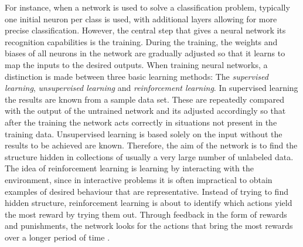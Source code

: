 		
		

For instance, when a network is used to solve a classification problem, typically one initial neuron per class is used, with additional layers allowing for more precise classification. However, the central step that gives a neural network its recognition capabilities is the training. During the training, the weights and biases of all neurons in the network are gradually adjusted so that it learns to map the inputs to the desired outputs. When training neural networks, a distinction is made between three basic learning methods: The \textit{supervised learning}, \textit{unsupervised learning} and \textit{reinforcement learning}. In supervised learning the results are known from a sample data set. These are repeatedly compared with the output of the untrained network and its adjusted accordingly so that after the training the network acts correctly in situations not present in the training data. Unsupervised learning is based solely on the input without the results to be achieved are known. Therefore, the aim of the network is to find the structure hidden in collections of usually a very large number of unlabeled data. The idea of reinforcement learning is learning by interacting with the environment, since in interactive problems it is often impractical to obtain examples of desired behaviour that are representative. Instead of trying to find hidden structure, reinforcement learning is about to identify which actions yield the most reward by trying them out. Through feedback in the form of rewards and punishments, the network looks for the actions that bring the most rewards over a longer period of time \cite{reinforce2018learning}. 



